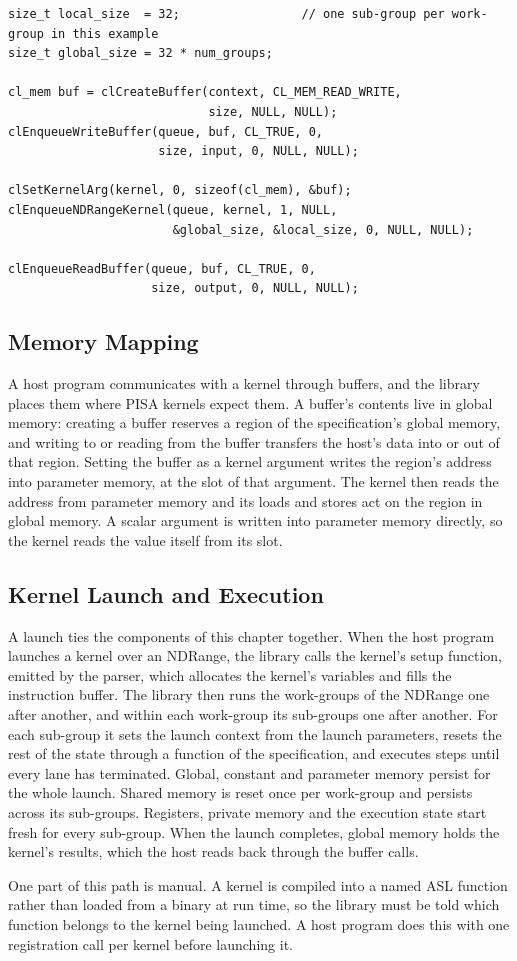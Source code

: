 \begin{lstlisting}[caption={Host-side usage of the library.},
label={lst:host-usage}]
size_t local_size  = 32;                 // one sub-group per work-group in this example
size_t global_size = 32 * num_groups;

cl_mem buf = clCreateBuffer(context, CL_MEM_READ_WRITE,
                            size, NULL, NULL);
clEnqueueWriteBuffer(queue, buf, CL_TRUE, 0,
                     size, input, 0, NULL, NULL);

clSetKernelArg(kernel, 0, sizeof(cl_mem), &buf);
clEnqueueNDRangeKernel(queue, kernel, 1, NULL,
                       &global_size, &local_size, 0, NULL, NULL);

clEnqueueReadBuffer(queue, buf, CL_TRUE, 0,
                    size, output, 0, NULL, NULL);
\end{lstlisting}

\subsection{Memory Mapping}
\label{sec:host-memory}

A host program communicates with a kernel through buffers, and the library
places them where PISA kernels expect them. A buffer's contents live in
global memory: creating a buffer reserves a region of the specification's
global memory, and writing to or reading from the buffer transfers the
host's data into or out of that region. Setting the buffer as a kernel
argument writes the region's address into parameter memory, at the slot of
that argument. The kernel then reads the address from parameter memory and
its loads and stores act on the region in global memory. A scalar argument
is written into parameter memory directly, so the kernel reads the value
itself from its slot.

\subsection{Kernel Launch and Execution}
\label{sec:host-launch}

A launch ties the components of this chapter together. When the host
program launches a kernel over an NDRange, the library calls the kernel's
setup function, emitted by the parser, which allocates the kernel's
variables and fills the instruction buffer. The library then runs the
work-groups of the NDRange one after another, and within each work-group
its sub-groups one after another. For each sub-group it sets the launch
context from the launch parameters, resets the rest of the state through
a function of the specification, and executes steps until every lane has
terminated. Global, constant and parameter memory persist for the whole
launch. Shared memory is reset once per work-group and persists across
its sub-groups. Registers, private memory and the execution state start
fresh for every sub-group. When the launch completes, global memory
holds the kernel's results, which the host reads back through the buffer
calls.

One part of this path is manual. A kernel is compiled into a named ASL
function rather than loaded from a binary at run time, so the library must
be told which function belongs to the kernel being launched. A host program
does this with one registration call per kernel before launching it.
